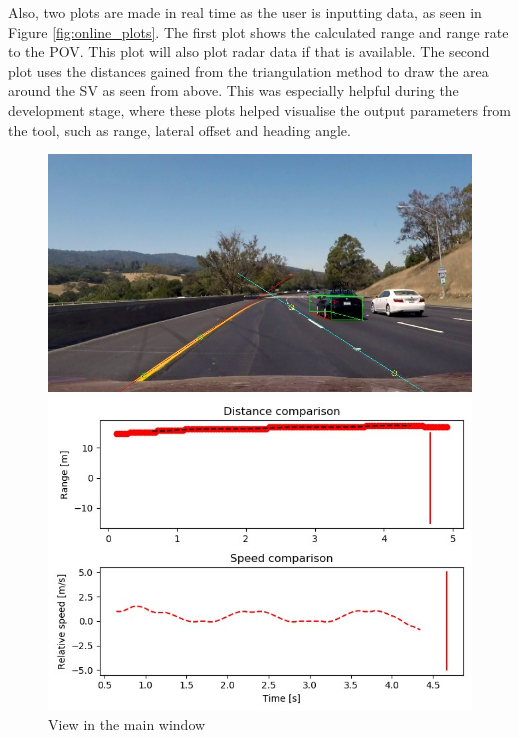 Also, two plots are made in real time as the user is inputting data, as seen in Figure \ref{fig:online_plots}. The first plot shows the calculated range and range rate to the POV. This plot will also plot radar data if that is available. The second plot uses the distances gained from the triangulation method to draw the area around the SV as seen from above. This was especially helpful during the development stage, where these plots helped visualise the output parameters from the tool, such as range, lateral offset and heading angle. 

\begin{figure}[H]
\centering
\begin{minipage}[b]{0.45\linewidth}
    \includegraphics[width=\textwidth]{Figures/GUI_all_inputs.jpg}
    \vspace{2mm}
    \caption*{View in the main window}
\end{minipage}
\begin{minipage}[b]{0.45\linewidth}
    \includegraphics[width=\textwidth]{Figures/online_plot.jpg}

\end{minipage}
\end{figure}
